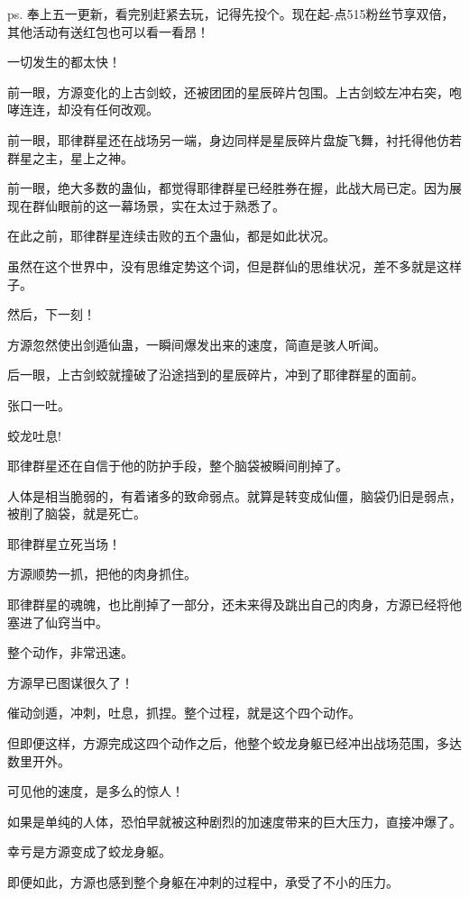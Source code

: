 
\begin{this_body}

ps. 奉上五一更新，看完别赶紧去玩，记得先投个。现在起-点515粉丝节享双倍，其他活动有送红包也可以看一看昂！

一切发生的都太快！

前一眼，方源变化的上古剑蛟，还被团团的星辰碎片包围。上古剑蛟左冲右突，咆哮连连，却没有任何改观。

前一眼，耶律群星还在战场另一端，身边同样是星辰碎片盘旋飞舞，衬托得他仿若群星之主，星上之神。

前一眼，绝大多数的蛊仙，都觉得耶律群星已经胜券在握，此战大局已定。因为展现在群仙眼前的这一幕场景，实在太过于熟悉了。

在此之前，耶律群星连续击败的五个蛊仙，都是如此状况。

虽然在这个世界中，没有思维定势这个词，但是群仙的思维状况，差不多就是这样子。

然后，下一刻！

方源忽然使出剑遁仙蛊，一瞬间爆发出来的速度，简直是骇人听闻。

后一眼，上古剑蛟就撞破了沿途挡到的星辰碎片，冲到了耶律群星的面前。

张口一吐。

蛟龙吐息!

耶律群星还在自信于他的防护手段，整个脑袋被瞬间削掉了。

人体是相当脆弱的，有着诸多的致命弱点。就算是转变成仙僵，脑袋仍旧是弱点，被削了脑袋，就是死亡。

耶律群星立死当场！

方源顺势一抓，把他的肉身抓住。

耶律群星的魂魄，也比削掉了一部分，还未来得及跳出自己的肉身，方源已经将他塞进了仙窍当中。

整个动作，非常迅速。

方源早已图谋很久了！

催动剑遁，冲刺，吐息，抓捏。整个过程，就是这个四个动作。

但即便这样，方源完成这四个动作之后，他整个蛟龙身躯已经冲出战场范围，多达数里开外。

可见他的速度，是多么的惊人！

如果是单纯的人体，恐怕早就被这种剧烈的加速度带来的巨大压力，直接冲爆了。

幸亏是方源变成了蛟龙身躯。

即便如此，方源也感到整个身躯在冲刺的过程中，承受了不小的压力。


\end{this_body}
